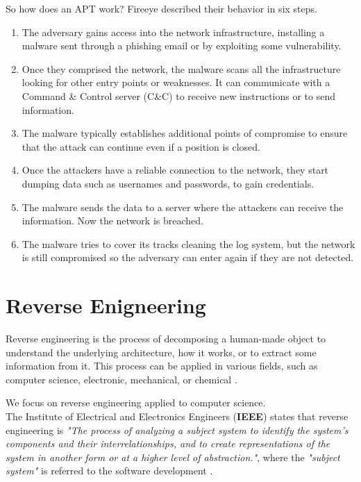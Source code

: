 So how does an APT work? Fireeye described their behavior in six steps. \cite{fireeye_anatomy}


\begin{enumerate}
	\item The adversary gains access into the network infrastructure, installing a malware sent through a phishing email or by exploiting some vulnerability.
	\item Once they comprised the network, the malware scans all the infrastructure looking for other entry points or weaknesses. It can communicate with a Command \& Control server (C\&C) to receive new instructions or to send information.
	\item The malware typically establishes additional points of compromise to ensure that the attack can continue even if a position is closed.
	\item Once the attackers have a reliable connection to the network, they start dumping data such as usernames and passwords, to gain credentials.
	
	\item The malware sends the data to a server where the attackers can receive the information. Now the network is breached.
	
	\item The malware tries to cover its tracks cleaning the log system, but the network is still compromised so the adversary can enter again if they are not detected.
	
\end{enumerate}

\section{Reverse Enigneering}

Reverse engineering is the process of decomposing a human-made object to understand the underlying architecture, how it works, or to extract some information from it. This process can be applied in various fields, such as computer science, electronic, mechanical, or chemical \cite{eilam2011reversing}.

We focus on reverse engineering applied to computer science. 
\\

The Institute of Electrical and Electronics Engineers (\textbf{IEEE}) states that reverse engineering is \textit{"The process of analyzing a subject system to identify the system's components and their interrelationships, and to create representations of the system in another form or at a higher level of abstraction."}, where the \textit{"subject system"} is referred to the software development \cite{chikofsky1990reverse}. 

